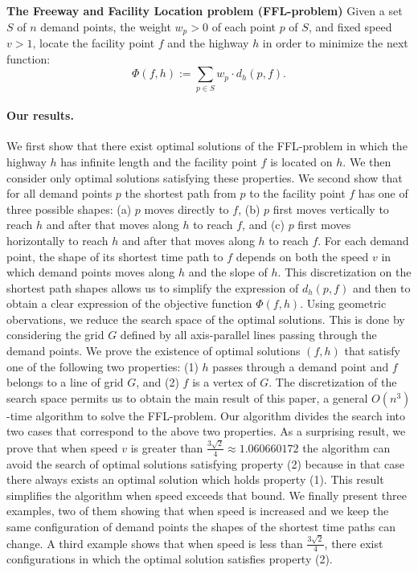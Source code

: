 \documentclass[11pt,a4paper,oneside,onecolumn]{article}
\begin{document}
\medskip

{\bf The Freeway and Facility Location problem (FFL-problem)} Given
a set $S$ of $n$ demand points, the weight $w_p>0$ of each point $p$ of
$S$, and fixed speed $v>1$, locate the facility point $f$ and the
highway $h$ in order to minimize the next function:
\begin{equation}\label{eqnobj}
\Phi(f,h):=\sum_{p\in S}w_p \cdot d_h(p,f).
\end{equation}


\paragraph{Our results.}
We first show that there exist
optimal solutions of the FFL-problem in which the highway $h$ has
infinite length and the facility point $f$ is located on $h$. We
then consider only optimal solutions satisfying these properties. We
second show that for all demand points $p$ the shortest path
from $p$ to the facility point $f$ has one of three possible shapes:
(a) $p$ moves directly to $f$, (b) $p$ first moves vertically to
reach $h$ and after that moves along $h$ to reach $f$, and (c) $p$
first moves horizontally to reach $h$ and after that moves along $h$
to reach $f$. For each demand point, the shape of its shortest time
path to $f$ depends on both the speed $v$ in which demand points
moves along $h$ and the slope of $h$. This discretization on the
shortest path shapes allows us to simplify the expression of
$d_h(p,f)$ and then to obtain a clear
expression of the objective function $\Phi(f,h)$. 
Using geometric obervations, we reduce the search space of the optimal solutions. This is
done by considering
the grid $G$ defined by all axis-parallel lines passing through the
demand points. 
We prove the existence of optimal solutions $(f,h)$
that satisfy one of the following two properties: (1) $h$ passes
through a demand point and $f$ belongs to a line of grid $G$, and
(2) $f$ is a vertex of $G$. The discretization of the search space
permits us to obtain the main result of this paper, a general
$O(n^3)$-time algorithm to solve the FFL-problem. Our algorithm
divides the search into two cases that correspond to the above two
properties. As a surprising result, we prove that when speed $v$ is
greater than $\frac{3\sqrt{2}}{4}\approx 1.060660172$ the algorithm
can avoid the search of optimal solutions satisfying property (2)
because in that case there always exists an optimal solution which
holds property (1). This result simplifies the algorithm when speed
exceeds that bound. We finally present three examples,
two of them showing that when speed is increased and we keep the
same configuration of demand points the shapes of the shortest time
paths can change. A third example shows that when speed is less
than $\frac{3\sqrt{2}}{4}$, there exist configurations in which the
optimal solution satisfies property (2).
\end{document}
